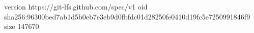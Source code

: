 version https://git-lfs.github.com/spec/v1
oid sha256:96300bed7ab1d5b0eb7e3eb9d0fbfdc01d28250fe0410d19fc5e7250991846f9
size 147670
